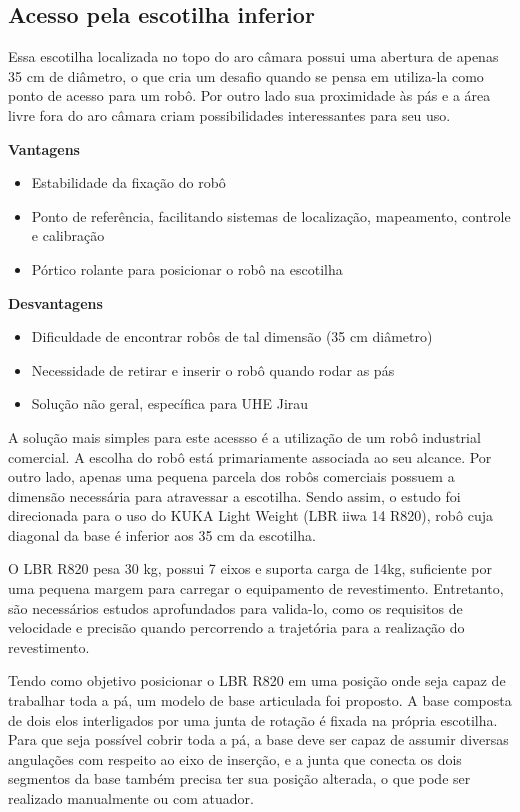\subsection{Acesso pela escotilha inferior}
Essa escotilha localizada no topo do aro câmara possui uma abertura de apenas
35 cm de diâmetro, o que cria um desafio quando se pensa em utiliza-la como
ponto de acesso para um robô. Por outro lado sua proximidade às pás e a área livre fora do aro
câmara criam possibilidades interessantes para seu uso.

\textbf{Vantagens}
\begin{itemize}
  \item Estabilidade da fixação do robô
  \item Ponto de referência, facilitando sistemas de localização, mapeamento, controle e calibração
  \item Pórtico rolante para posicionar o robô na escotilha
\end{itemize}

\textbf{Desvantagens}
\begin{itemize}
  \item Dificuldade de encontrar robôs de tal dimensão (35 cm diâmetro)
  \item Necessidade de retirar e inserir o robô quando rodar as pás
  \item Solução não geral, específica para UHE Jirau
\end{itemize}

A solução mais simples para este acessso é a utilização de um robô industrial
comercial. A escolha do robô está primariamente associada ao seu alcance. Por outro lado, apenas
uma pequena parcela dos robôs comerciais possuem a dimensão necessária para
atravessar a escotilha. Sendo assim, o estudo foi direcionada para o uso do
KUKA Light Weight (LBR iiwa 14 R820), robô cuja diagonal da base é inferior aos
35 cm da escotilha.

O LBR R820 pesa 30 kg, possui 7 eixos e suporta carga de 14kg,
suficiente por uma pequena margem para carregar o equipamento de
revestimento. Entretanto, são necessários estudos aprofundados para valida-lo,
como os requisitos de velocidade e precisão quando percorrendo a trajetória
para a realização do revestimento.

Tendo como objetivo posicionar o LBR R820 em uma posição onde seja capaz de
trabalhar toda a pá, um modelo de base articulada foi proposto. A base
composta de dois elos interligados por uma junta de rotação é fixada na
própria escotilha. Para que seja possível cobrir toda a pá,
a base deve ser capaz de assumir diversas angulações com respeito ao
eixo de inserção, e a junta que conecta os dois segmentos da base também precisa
ter sua posição alterada, o que pode ser realizado manualmente ou com atuador.

